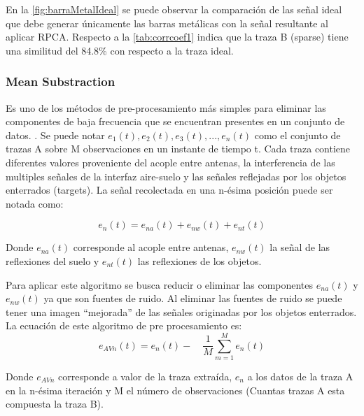 En la \figurename{ \ref{fig:barraMetalIdeal}} se puede observar la comparación de las señal ideal que debe generar únicamente las barras metálicas  con la señal resultante al aplicar RPCA.  Respecto a la \tablename{ \ref{tab:corrcoef1}} indica que la traza B (sparse) tiene una similitud del 84.8\% con respecto a la traza ideal.


\subsubsection{Mean Substraction}

Es uno  de los métodos de pre-procesamiento más simples para eliminar las componentes de baja frecuencia que se encuentran presentes en un conjunto de datos. \cite{round_Clutter_Removal_in_GPR_Surveys}. Se puede notar ${ e }_{ 1 }{ \left( t \right)  },{ e }_{ 2 }{ \left( t \right)  },{ e }_{ 3 }{ \left( t \right)  },...,{ e }_{ n }{ \left( t \right)  }$ como el conjunto de trazas A sobre M observaciones en un instante de tiempo t.  Cada traza contiene diferentes valores proveniente del acople entre antenas, la interferencia de las multiples señales de la interfaz aire-suelo y las señales reflejadas por los objetos enterrados (targets). La señal recolectada en una n-ésima posición puede ser notada como:

\begin{equation}
{ e }_{ n }{ \left( t \right)  }={ e }_{ na }{ \left( t \right)  }+{ e }_{ nw }{ \left( t \right)  }+{ e }_{ nt }{ \left( t \right)  }
\end{equation}

Donde ${ e }_{ na }{ \left( t \right)  }$ corresponde al acople entre antenas, ${ e }_{ nw }{ \left( t \right)  }$ la señal de las reflexiones del suelo y ${ e }_{ nt }{ \left( t \right)  }$ las reflexiones de los objetos.

Para aplicar este algoritmo se busca reducir o eliminar las componentes ${ e }_{ na }{ \left( t \right)  }$ y ${ e }_{ nw }{ \left( t \right)  }$ ya que son fuentes de ruido. Al eliminar las fuentes de ruido se puede tener una imagen ``mejorada'' de las señales originadas por los objetos enterrados.
La ecuación de este algoritmo de pre procesamiento  es:
\begin{equation}
{ e }_{ AVn }{ \left( t \right)  }={ e }_{ n }{ \left( t \right)  }-\quad \frac { 1 }{ M }  \sum _{ m=1 }^{ M }{ { e }_{ n }{ \left( t \right)  } } 
\end{equation}

Donde ${ e }_{ AVn }$ corresponde a valor de la traza extraída,  ${ e }_{ n }$ a los datos de la traza A en la n-ésima iteración y M el número de observaciones (Cuantas trazas A esta compuesta la traza B).
\newpage
{}

